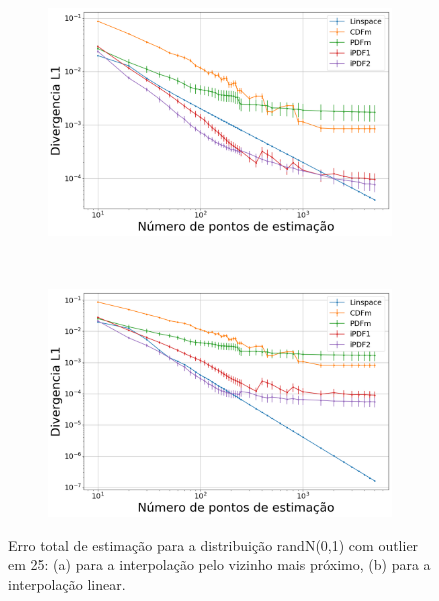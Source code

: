 \begin{figure}[H]
	\centering
	\begin{subfigure}[b]{0.45\textwidth}
		\centering 
		\includegraphics[width=\textwidth]{./figuras/ERRORPLOT_L1_FALSE_NORMAL_NEAREST_100025_}
		\caption{}
		\label{fig:error_norm_near_data_50}
	\end{subfigure}
	\hfill
	~ %
	\begin{subfigure}[b]{0.45\textwidth}
		\centering 
		\includegraphics[width=\textwidth]{./figuras/ERRORPLOT_L1_FALSE_NORMAL_LINEAR_100025_}
		\caption{}
		\label{fig:error_norm_lin_data_50}
	\end{subfigure}
	\caption{Erro total de estimação para a distribuição randN(0,1) com outlier em 25: (a) para a interpolação pelo vizinho mais próximo, (b) para a interpolação linear.}
	\label{fig:Error_out_data}
\end{figure}

